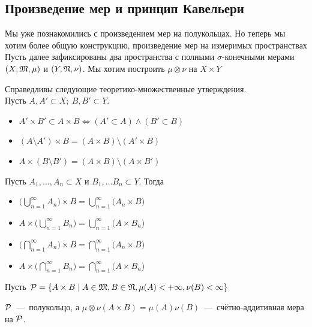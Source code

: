 \subsection{Произведение мер и принцип Кавельери}
Мы уже познакомились с произведением мер на полукольцах. Но теперь мы хотим более общую конструкцию, произведение мер на измеримых пространствах
Пусть далее зафиксированы два пространства с полными $\sigma$-конечными мерами $(X, \mathfrak{M}, \mu)$ и $(Y, \mathfrak{N}, \nu)$. Мы хотим построить $\mu\otimes\nu$ на $X\times Y$
\begin{fact}
    Справедливы следующие теоретико-множественные утверждения. \\ Пусть $A, A' \subset X; \ B, B' \subset Y$.
    \begin{itemize}
        \item $A'\times B' \subset A \times B \Longleftrightarrow (A' \subset A) \wedge (B' \subset B)$
        \item $(A \setminus A') \times B = (A \times B) \setminus (A' \times B)$
        \item $A \times (B \setminus B') = (A \times B) \setminus (A \times B')$
    \end{itemize}
    Пусть $A_1, \ldots, A_n \subset X$ и $B_1, \ldots B_n \subset Y$. Тогда 
    \begin{itemize}
        \item $\biggl(\bigcup\limits_{n = 1}^\infty A_n \biggr) \times B = \bigcup\limits_{n = 1}^\infty \biggl(A_n \times B\biggr)$
        \item $A \times \biggl(\bigcup\limits_{n = 1}^\infty B_n \biggr) = \bigcup\limits_{n = 1}^\infty \biggl(A \times B_n\biggr)$
        \item $\biggl(\bigcap\limits_{n = 1}^\infty A_n \biggr) \times B = \bigcap\limits_{n = 1}^\infty \biggl(A_n \times B\biggr)$
        \item $A \times \biggl(\bigcap\limits_{n = 1}^\infty B_n \biggr) = \bigcap\limits_{n = 1}^\infty \biggl(A \times B_n\biggr)$

        
    \end{itemize}
\end{fact}
Пусть $\mathcal{P} = \{A \times B \mid A \in \mathfrak{M}, B \in \mathfrak{N}, \mu(A) < +\infty, \nu(B) < \infty\}$
\begin{lemma}
    $\mathcal{P}$~---~полукольцо, а $\mu\otimes\nu(A \times B) = \mu(A)\nu(B)$~---~счётно-аддитивная мера на $\mathcal{P}$.
\end{lemma}
